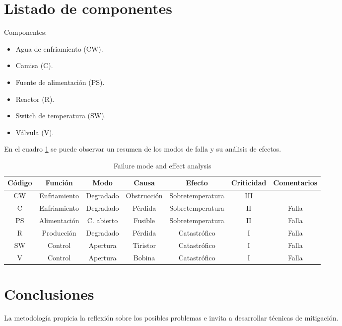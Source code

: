 \documentclass[
    11pt,
    spanish,
    a4paper
]{article}
\begin{document}
\section{Listado de componentes}

Componentes:

\begin{itemize}
	\item Agua de enfriamiento (CW).
	\item Camisa (C).
	\item Fuente de alimentación (PS).
	\item Reactor (R).
	\item Switch de temperatura (SW).
	\item Válvula (V).
\end{itemize}

En el cuadro \ref{tab:failure} se puede observar un resumen de los modos de falla y su análisis de efectos.

\begin{table}[h]
	\centering
	\caption[Failure mode and effect analysis]{Failure mode and effect analysis}
	\begin{tabular}{c c c c c c c}
		\toprule
		\textbf{Código} & \textbf{Función} & \textbf{Modo} & \textbf{Causa} & \textbf{Efecto}  & \textbf{Criticidad} & \textbf{Comentarios} \\
		\midrule
		CW              & Enfriamiento     & Degradado     & Obstrucción    & Sobretemperatura & III                 &                      \\
		C               & Enfriamiento     & Degradado     & Pérdida        & Sobretemperatura & II                  & Falla                \\
		PS              & Alimentación     & C. abierto    & Fusible        & Sobretemperatura & II                  & Falla                \\
		R               & Producción       & Degradado     & Pérdida        & Catastrófico     & I                   & Falla                \\
		SW              & Control          & Apertura      & Tiristor       & Catastrófico     & I                   & Falla                \\
		V               & Control          & Apertura      & Bobina         & Catastrófico     & I                   & Falla                \\
		\bottomrule
		\hline
	\end{tabular}
	\label{tab:failure}
\end{table}

\section{Conclusiones}

La metodología propicia la reflexión sobre los posibles problemas e invita a desarrollar técnicas de mitigación.
\end{document}
